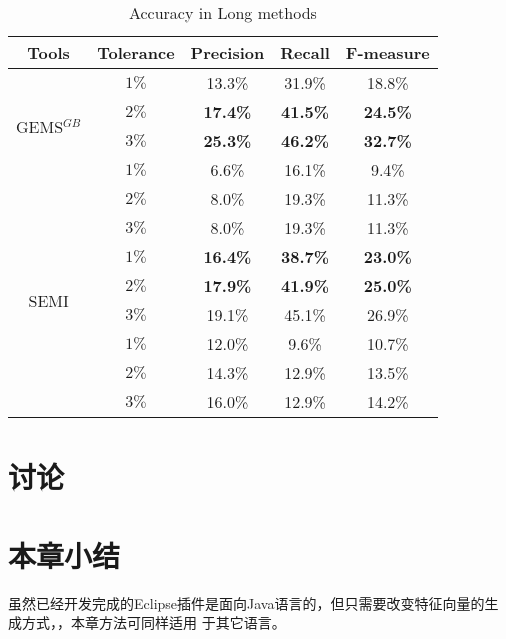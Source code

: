 \begin{table}[!t]
  \renewcommand{\arraystretch}{1.3}
  \caption{Accuracy in Long methods}
  \label{long_methods}
  \centering
  \begin{tabular}{cc|ccc}
  \toprule
   Tools &Tolerance &Precision &Recall &F-measure\\ 
  \hline
  \multirow{4}{*}{GEMS$^{GB}$}&$1\%$ &13.3\% &31.9\% &18.8\% \\ 
  &$2\%$ &\bf{17.4\%} &\bf{41.5\%} &\bf{24.5\%} \\ 
  &$3\%$ &\bf{25.3\%} &\bf{46.2\%} &\bf{32.7\%} \\ 
  \hline
  \multirow{4}{*}{JExtract}&$1\%$ &6.6\% &16.1\% &9.4\% \\ 
  &$2\%$ &8.0\% &19.3\% &11.3\% \\ 
  &$3\%$ &8.0\% &19.3\% &11.3\% \\ 
  \hline
  \multirow{4}{*}{SEMI}&$1\%$ &\bf{16.4\%} &\bf{38.7\%} &\bf{23.0\%} \\ 
  &$2\%$ &\bf{17.9\%} &\bf{41.9\%} &\bf{25.0\%} \\ 
  &$3\%$ &19.1\% &45.1\% &26.9\% \\ 
  \hline
  \multirow{4}{*}{JDeodorant}&$1\%$ &12.0\% &9.6\% &10.7\% \\
  &$2\%$ &14.3\% &12.9\% &13.5\% \\ 
  &$3\%$ &16.0\% &12.9\% &14.2\% \\ 
  \bottomrule
  \end{tabular}
  \end{table}

\section{讨论}

\section{本章小结}
虽然已经开发完成的Eclipse插件是面向Java语言的，但只需要改变特征向量的生成方式，，本章方法可同样适用
于其它语言。